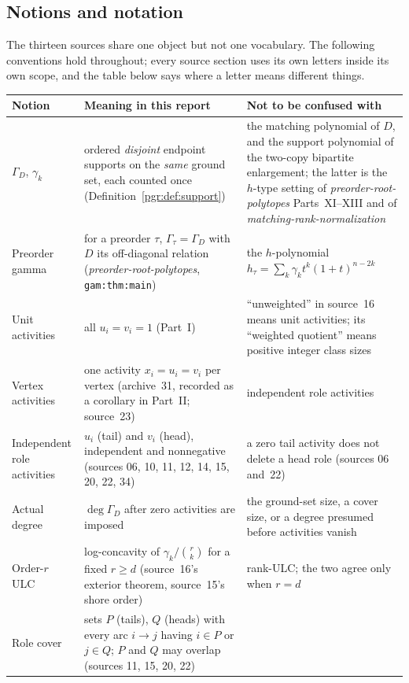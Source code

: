 \documentclass[11pt]{article}
\numberwithin{equation}{section}
\theoremstyle{definition}\newtheorem{definition}[theorem]{Definition}\newtheorem{remark}[theorem]{Remark}
\newcommand{\Ga}{\Gamma}                   %
\newcommand{\prp}{\emph{preorder-root-polytopes}}
\newcommand{\mrn}{\emph{matching-rank-normalization}}
\begin{document}
\subsection{Notions and notation}\label{pgr:sec:notions}
The thirteen sources share one object but not one vocabulary. The following %
conventions hold throughout; every source section uses its own letters
inside its own scope, and the table below says where a letter means
different things.

\begin{center}\small
\begin{longtable}{p{28mm}p{60mm}p{56mm}}
\toprule
Notion & Meaning in this report & Not to be confused with\\\midrule
\endhead
$\Ga_D$, $\gamma_k$ & ordered \emph{disjoint} endpoint supports on the
  \emph{same} ground set, each counted once
  (Definition~\ref{pgr:def:support}) & the matching polynomial of $D$, and
  the support polynomial of the two-copy bipartite enlargement; the latter
  is the $h$-type setting of \prp{} Parts~XI--XIII and of \mrn{}\\
Preorder gamma & for a preorder $\tau$, $\Ga_\tau=\Ga_D$ with $D$ its
  off-diagonal relation (\prp, \texttt{gam:thm:main}) & the $h$-polynomial
  $h_\tau=\sum_k\gamma_kt^k(1+t)^{n-2k}$\\
Unit activities & all $u_i=v_i=1$ (Part~I) & ``unweighted'' in source~16
  means unit activities; its ``weighted quotient'' means positive integer
  class sizes\\
Vertex activities & one activity $x_i=u_i=v_i$ per vertex (archive~31,
  recorded as a corollary in Part~II; source~23) & independent role
  activities\\
Independent role activities & $u_i$ (tail) and $v_i$ (head), independent
  and nonnegative (sources 06, 10, 11, 12, 14, 15, 20, 22, 34) & a zero tail
  activity does not delete a head role (sources 06 and~22)\\
Actual degree & $\deg\Ga_D$ after zero activities are imposed & the
  ground-set size, a cover size, or a degree presumed before activities
  vanish\\
Order-$r$ ULC & log-concavity of $\gamma_k/\binom rk$ for a fixed $r\ge d$
  (source~16's exterior theorem, source~15's shore order) & rank-ULC; the
  two agree only when $r=d$\\
Role cover & sets $P$ (tails), $Q$ (heads) with every arc $i\to j$ having
  $i\in P$ or $j\in Q$; $P$ and $Q$ may overlap (sources 11, 15, 20, 22) &

\end{longtable}
\end{center}
\end{document}

